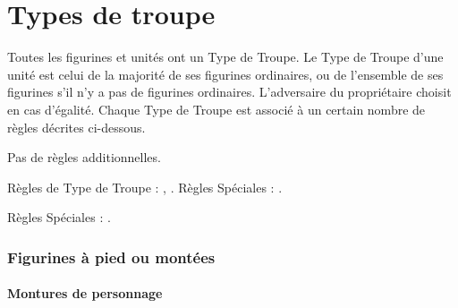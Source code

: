 
\part{Types de troupe}
\label{troop_types}

Toutes les figurines et unités ont un Type de Troupe. Le Type de Troupe d'une unité est celui de la majorité de ses figurines ordinaires, ou de l'ensemble de ses figurines s'il n'y a pas de figurines ordinaires. L'adversaire du propriétaire choisit en cas d'égalité. Chaque Type de Troupe est associé à un certain nombre de règles décrites ci-dessous.

{\setlength{\parindent}{0cm}
\textbf{\infantry}
\vspace*{3pt}
Pas de règles additionnelles.

\textbf{\cavalry}
\vspace*{3pt}
Règles de Type de Troupe : \combinedprofile{}, \cavalrysupport{}.
Règles Spéciales : \swiftstride{}.

\textbf{\warbeast}
\vspace*{3pt}
Règles Spéciales : \swiftstride{}.
}


\section{Figurines à pied ou montées}


\subsection{Montures de personnage}

